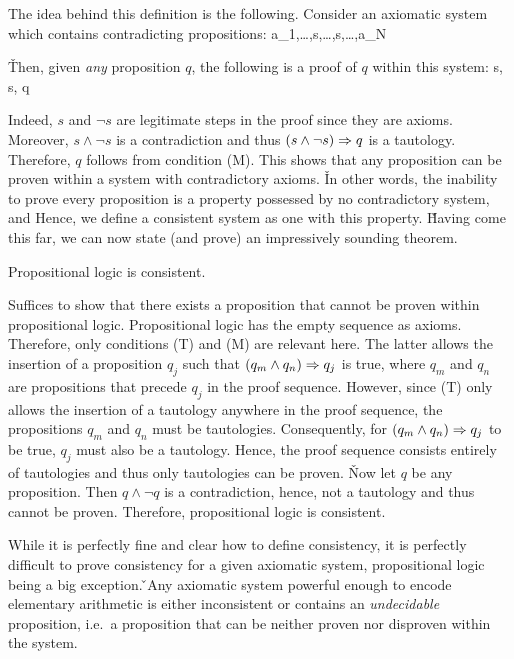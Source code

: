 The idea behind this definition is the following. Consider an axiomatic system which contains contradicting
propositions:
\bse
a_1,\ldots,s,\ldots,\neg s,\ldots,a_N
\ese

\v

Then, given \emph{any} proposition $q$, the following is a proof of $q$ within this system:
\bse
s, \neg s, q
\ese

Indeed, $s$ and $\neg s$ are legitimate steps in the proof since they are axioms. Moreover, $s\land \neg s$ is a
contradiction and thus $(s\land \neg s) \Rightarrow q$ is a tautology. Therefore, $q$ follows from condition (M). This shows
that any proposition can be proven within a system with contradictory axioms. \v

In other words, the inability to prove every proposition is a property possessed by no contradictory system, and
Hence, we define a consistent system as one with this property. \v

Having come this far, we can now state (and prove) an impressively sounding theorem.

\bt[]
Propositional logic is consistent.
\et

\bq
Suffices to show that there exists a proposition that cannot be proven within propositional logic. Propositional
logic has the empty sequence as axioms. Therefore, only conditions (T) and (M) are relevant here. The latter allows
the insertion of a proposition $q_j$ such that $(q_m\land q_n) \Rightarrow q_j$ is true, where $q_m$ and $q_n$ are
propositions that precede $q_j$ in the proof sequence. However, since (T) only allows the insertion of a tautology
anywhere in the proof sequence, the propositions $q_m$ and $q_n$ must be tautologies. Consequently, for $(q_m\land
q_n) \Rightarrow q_j$ to be true, $q_j$ must also be a tautology. Hence, the proof sequence consists entirely of tautologies
and thus only tautologies can be proven. \v

Now let $q$ be any proposition. Then $q\land \neg q$ is a contradiction, hence, not a tautology and thus cannot be
proven. Therefore, propositional logic is consistent.
\eq

While it is perfectly fine and clear how to define consistency, it is perfectly difficult to prove consistency for a
given axiomatic system, propositional logic being a big exception. \v

\bt[]
Any axiomatic system powerful enough to encode elementary arithmetic is either inconsistent or contains an
\emph{undecidable} proposition, i.e.\ a proposition that can be neither proven nor disproven
within the system.
\et

